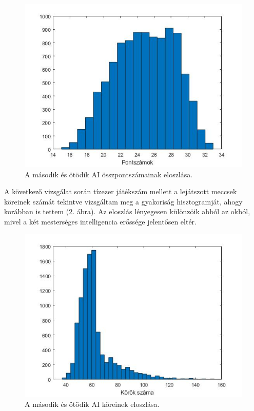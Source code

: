 \begin{figure}[h]
\centering
\includegraphics[scale=0.55]{images/final_scores_AI2vsAI5.jpg}
\caption{A második és ötödik AI összpontszámainak eloszlása.}
\label{fig:scores2v5}
\end{figure}

A következő vizsgálat során tízezer játékszám mellett a lejátszott meccsek köreinek számát tekintve vizsgáltam meg a gyakoriság hisztogramját, ahogy korábban is tettem (\ref{fig:rounds2v5}. ábra). Az eloszlás lényegesen különzöik abból az okból, mivel a két mesterséges intelligencia erőssége jelentősen eltér.


\begin{figure}[h]
\centering
\includegraphics[scale=0.5]{images/round_number_hist_AI2vsAI5.jpg}
\caption{A második és ötödik AI köreinek eloszlása.}
\label{fig:rounds2v5}
\end{figure}

